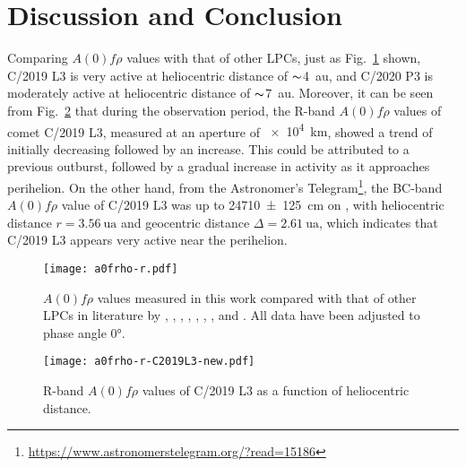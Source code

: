 \section{Discussion and Conclusion}\label{sec:dis}


Comparing $A(0)f\rho$ values with that of other LPCs, just as Fig.~\ref{fig:afrho-ref} shown, C/2019 L3 is very active at heliocentric distance of $\thicksim${\qty{4}{\astronomicalunit}}, and C/2020 P3 is moderately active at heliocentric distance of $\thicksim${\qty{7}{\astronomicalunit}}. 
Moreover, %
it can be seen from Fig.~\ref{fig:a0frho-c2019} that during the observation period, the R-band $A(0)f\rho$ values of comet C/2019 L3, measured at an aperture of {\SI{e4}{\km}}, showed a trend of initially decreasing followed by an increase. This could be attributed to a previous outburst, followed by a gradual increase in activity as it approaches perihelion. 
On the other hand, from the Astronomer's Telegram\footnote{\url{https://www.astronomerstelegram.org/?read=15186}}, the BC-band $A(0)f\rho$ value of C/2019 L3 was up to \SI{24710 +- 125}{\cm} on , with heliocentric distance $r = \SI{3.56}{\astronomicalunit}$ and geocentric distance $\Delta = \SI{2.61}{\astronomicalunit}$, which indicates that C/2019 L3 appears very active near the perihelion. 


\begin{figure}
    \centering
    \texttt{[image: a0frho-r.pdf]}
    \caption{$A(0)f\rho$ values measured in this work compared with that of other LPCs in  literature by \citet{mazzotta_epifani_observational_2014}, \citet{garcia_photometry_2021}, \citet{garcia_observational_2020}, \citet{rousselot_monitoring_2014}, \citet{meech_activity_2009}, \citet{sarneczky_activity_2016}, \citet{solontoi_ensemble_2012}, and \citet{szabo_spectrophotometry_2002}. All data have been adjusted to phase angle \ang{0}. }\label{fig:afrho-ref}
\end{figure}%

\begin{figure}
    \centering
    \texttt{[image: a0frho-r-C2019L3-new.pdf]}
    \caption{R-band $A(0)f\rho$ values of C/2019 L3 as a function of heliocentric distance. }\label{fig:a0frho-c2019}
\end{figure}

